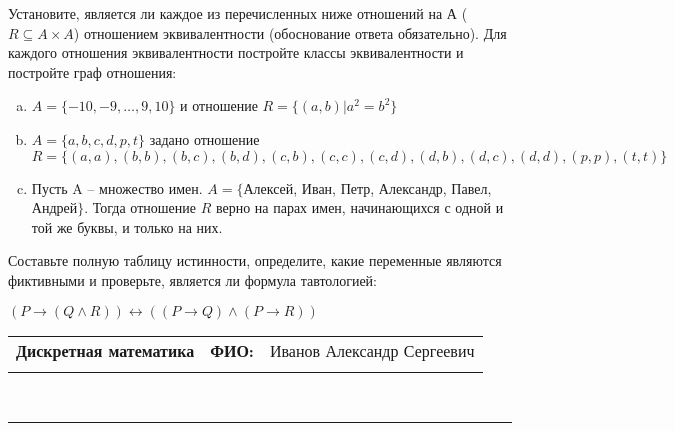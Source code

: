 \documentclass[10pt]{exam}
\newcommand{\class}{Дискретная математика}
\newcommand{\examdate}{}
\begin{document}
\begin{questions}
\question
Установите, является ли каждое из перечисленных ниже отношений на А ($R \subseteq A \times A$) отношением эквивалентности (обоснование ответа обязательно). Для каждого отношения эквивалентности постройте классы 
эквивалентности и постройте граф отношения:
\begin{enumerate} [a)]\setcounter{enumi}{0}
\item $A = \{-10, -9, … , 9, 10\}$ и отношение $R = \{(a,b)|a^{2} = b^{2}\}$
\item $A = \{a, b, c, d, p, t\}$ задано отношение $R = \{(a, a), (b, b), (b, c), (b, d), (c, b), (c, c), (c, d), (d, b), (d, c), (d, d), (p,p), (t,t)\}$
\item Пусть A – множество имен. $A = \{ $Алексей, Иван, Петр, Александр, Павел, Андрей$ \}$. Тогда отношение $R$ верно на парах имен, начинающихся с одной и той же буквы, и только на них.
\end{enumerate}\question Составьте полную таблицу истинности, определите, какие переменные являются фиктивными и проверьте, является ли формула тавтологией:

$(P \rightarrow (Q \land R)) \leftrightarrow ((P \rightarrow Q) \land (P \rightarrow R))$

\end{questions}
\newpage
\begin{flushright}
\begin{tabular}{p{2.8in} r l}
\textbf{\class} & \textbf{ФИО:} &Иванов Александр Сергеевич
\\

\textbf{\examdate} &&\\
\end{tabular}\\
\end{flushright}
\rule[1ex]{\textwidth}{.1pt}
\end{document}
